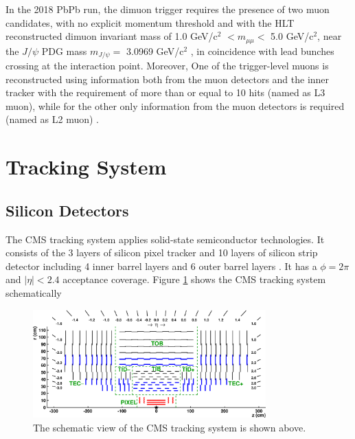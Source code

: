 In the 2018 PbPb run, the dimuon trigger requires the presence of two muon candidates, with no explicit momentum threshold and with the HLT reconstructed dimuon invariant mass of 1.0 GeV/c$^2$ $< m_{\mu\mu} <$ 5.0 GeV/c$^2$, near the $J/\psi$ PDG mass $m_{J/\psi} =$ 3.0969 GeV/c$^2$ \cite{AlphaTheoEx}, in coincidence with lead bunches crossing at the interaction point. Moreover, One of the trigger-level muons is reconstructed using information both from the muon detectors and the inner tracker with the requirement of more than or equal to 10 hits (named as L3 muon), while for the other only information from the muon detectors is required (named as L2 muon) \cite{BAnaDimuonTrigger}.

\section{Tracking System}

\subsection{Silicon Detectors}

The CMS tracking system applies solid-state semiconductor technologies. It consists of the 3 layers of silicon pixel tracker and 10 layers of silicon strip detector including 4 inner barrel layers and 6 outer barrel layers \cite{CMSSilicon}. It has a $\phi = 2\pi$ and $|\eta| < 2.4$ acceptance coverage. Figure \ref{CMSTracker} shows the CMS tracking system schematically

\begin{figure}[hbtp]
\begin{center}
\includegraphics[width=0.80\textwidth]{Figures/Chapter3/CMSTrackingSchemtic.png}
\caption{The schematic view of the CMS tracking system is shown above.}
\label{CMSTracker}
\end{center}
\end{figure} 



